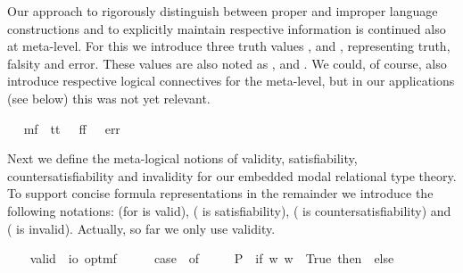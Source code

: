 \begin{isabellebody}
\begin{isamarkuptext}
Our approach to rigorously distinguish between proper and improper language constructions 
  and to explicitly maintain respective information is continued also at meta-level. For this 
  we introduce three truth values ,
   and , representing truth, falsity and error. These values are also 
  noted as \isa{{\isasymtop}}, \isa{{\isasymbottom}} and \isa{{\isacharasterisk}}. We could, of course, also introduce  
  respective logical connectives for the meta-level, but in our applications (see below)
  this was not yet relevant.%
\end{isamarkuptext}%
\isamarkuptrue%
\ \isamarkupfalse%
\ mf\ {\isacharequal}\ tt\ {\isacharparenleft}{\isachardoublequoteopen}{\isasymtop}{\isachardoublequoteclose}{\isacharparenright}\ {\isacharbar}\ ff\ {\isacharparenleft}{\isachardoublequoteopen}{\isasymbottom}{\isachardoublequoteclose}{\isacharparenright}\ {\isacharbar}\ err\ {\isacharparenleft}{\isachardoublequoteopen}{\isacharasterisk}{\isachardoublequoteclose}{\isacharparenright}%
\begin{isamarkuptext}%
Next we define the meta-logical notions of validity, satisfiability, 
  countersatisfiability and invalidity for our embedded modal relational type theory. To support
  concise formula representations in the remainder we introduce the following notations: \isa{{\isacharbrackleft}{\isasymphi}{\isacharbrackright}} 
  (for \isa{{\isasymphi}} is valid),  (\isa{{\isasymphi}} is satisfiability),  
  (\isa{{\isasymphi}} is countersatisfiability) and  (\isa{{\isasymphi}} is invalid). Actually, so far 
  we only use validity.%
\end{isamarkuptext}%
\isamarkuptrue%
\ \ \isamarkupfalse%
\ valid\ {\isacharcolon}{\isacharcolon}\ {\isachardoublequoteopen}io\ opt{\isasymRightarrow}mf{\isachardoublequoteclose}\ {\isacharparenleft}{\isachardoublequoteopen}{\isacharbrackleft}{\isacharunderscore}{\isacharbrackright}{\isachardoublequoteclose}\ {\isacharbrackleft}{}{\isacharbrackright}{\isacharparenright}\ \ {\isachardoublequoteopen}{\isacharbrackleft}{\isasymphi}{\isacharbrackright}\ {\isasymequiv}\ case\ {\isasymphi}\ of\ \isanewline
\ \ \ \ P{\isacharparenleft}{\isasympsi}{\isacharparenright}\ {\isasymRightarrow}\ if\ {\isasymforall}w{\isachardot}{\isacharparenleft}{\isasympsi}\ w{\isacharparenright}\ {\isasymlongleftrightarrow}\ True\ then\ {\isasymtop}\ else\ {\isasymbottom}\ \isanewline

\end{isabellebody}
